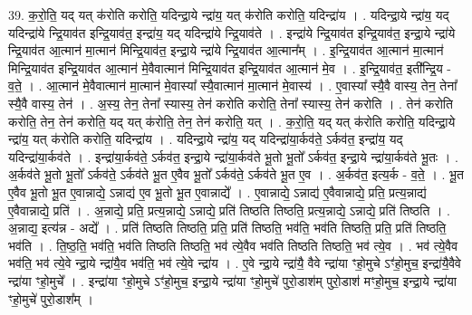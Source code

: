 \documentclass[17pt]{extarticle}
\begin{document}
39. क॒रो॒ति॒ यद् यत् क॑रोति करोति॒ यदिन्द्रा॒ये न्द्रा॑य॒ यत् क॑रोति करोति॒ यदिन्द्रा॑य । . यदिन्द्रा॒ये न्द्रा॑य॒ यद् यदिन्द्रा॑ये न्द्रि॒याव॑त इन्द्रि॒याव॑त॒ इन्द्रा॑य॒ यद् यदिन्द्रा॑ये न्द्रि॒याव॑ते । . इन्द्रा॑ये न्द्रि॒याव॑त इन्द्रि॒याव॑त॒ इन्द्रा॒ये न्द्रा॑ये न्द्रि॒याव॑त आ॒त्मान॑ मा॒त्मान॑ मिन्द्रि॒याव॑त॒ इन्द्रा॒ये न्द्रा॑ये न्द्रि॒याव॑त आ॒त्मान᳚म् । . इ॒न्द्रि॒याव॑त आ॒त्मान॑ मा॒त्मान॑ मिन्द्रि॒याव॑त इन्द्रि॒याव॑त आ॒त्मान॑ मे॒वैवात्मान॑ मिन्द्रि॒याव॑त इन्द्रि॒याव॑त आ॒त्मान॑ मे॒व । . इ॒न्द्रि॒याव॑त॒ इती᳚न्द्रि॒य - व॒ते॒ । . आ॒त्मान॑ मे॒वैवात्मान॑ मा॒त्मान॑ मे॒वास्या᳚ स्यै॒वात्मान॑ मा॒त्मान॑ मे॒वास्य॑ । . ए॒वास्या᳚ स्यै॒वै वास्य॒ तेन॒ तेना᳚ स्यै॒वै वास्य॒ तेन॑ । . अ॒स्य॒ तेन॒ तेना᳚ स्यास्य॒ तेन॑ करोति करोति॒ तेना᳚ स्यास्य॒ तेन॑ करोति । . तेन॑ करोति करोति॒ तेन॒ तेन॑ करोति॒ यद् यत् क॑रोति॒ तेन॒ तेन॑ करोति॒ यत् । . क॒रो॒ति॒ यद् यत् क॑रोति करोति॒ यदिन्द्रा॒ये न्द्रा॑य॒ यत् क॑रोति करोति॒ यदिन्द्रा॑य । . यदिन्द्रा॒ये न्द्रा॑य॒ यद् यदिन्द्रा॑या॒र्कव॑ते॒ ऽर्कव॑त॒ इन्द्रा॑य॒ यद् यदिन्द्रा॑या॒र्कव॑ते । . इन्द्रा॑या॒र्कव॑ते॒ ऽर्कव॑त॒ इन्द्रा॒ये न्द्रा॑या॒र्कव॑ते भू॒तो भू॒तो᳚ ऽर्कव॑त॒ इन्द्रा॒ये न्द्रा॑या॒र्कव॑ते भू॒तः । . अ॒र्कव॑ते भू॒तो भू॒तो᳚ ऽर्कव॑ते॒ ऽर्कव॑ते भू॒त ए॒वैव भू॒तो᳚ ऽर्कव॑ते॒ ऽर्कव॑ते भू॒त ए॒व । . अ॒र्कव॑त॒ इत्य॒र्क - व॒ते॒ । . भू॒त ए॒वैव भू॒तो भू॒त ए॒वान्नाद्ये॒ ऽन्नाद्य॑ ए॒व भू॒तो भू॒त ए॒वान्नाद्ये᳚ । . ए॒वान्नाद्ये॒ ऽन्नाद्य॑ ए॒वैवान्नाद्ये॒ प्रति॒ प्रत्य॒न्नाद्य॑ ए॒वैवान्नाद्ये॒ प्रति॑ । . अ॒न्नाद्ये॒ प्रति॒ प्रत्य॒न्नाद्ये॒ ऽन्नाद्ये॒ प्रति॑ तिष्ठति तिष्ठति॒ प्रत्य॒न्नाद्ये॒ ऽन्नाद्ये॒ प्रति॑ तिष्ठति । . अ॒न्नाद्य॒ इत्य॑न्न - अद्ये᳚ । . प्रति॑ तिष्ठति तिष्ठति॒ प्रति॒ प्रति॑ तिष्ठति॒ भव॑ति॒ भव॑ति तिष्ठति॒ प्रति॒ प्रति॑ तिष्ठति॒ भव॑ति । . ति॒ष्ठ॒ति॒ भव॑ति॒ भव॑ति तिष्ठति तिष्ठति॒ भव॑ त्ये॒वैव भव॑ति तिष्ठति तिष्ठति॒ भव॑ त्ये॒व । . भव॑ त्ये॒वैव भव॑ति॒ भव॑ त्ये॒वे न्द्रा॒ये न्द्रा॑यै॒व भव॑ति॒ भव॑ त्ये॒वे न्द्रा॑य । . ए॒वे न्द्रा॒ये न्द्रा॑यै॒ वैवे न्द्रा॑या ꣳहो॒मुचे ऽꣳ॑हो॒मुच॒ इन्द्रा॑यै॒वैवे न्द्रा॑या ꣳहो॒मुचे᳚ । . इन्द्रा॑या ꣳहो॒मुचे ऽꣳ॑हो॒मुच॒ इन्द्रा॒ये न्द्रा॑या ꣳहो॒मुचे॑ पुरो॒डाश॑म् पुरो॒डाश॑ मꣳहो॒मुच॒ इन्द्रा॒ये न्द्रा॑या ꣳहो॒मुचे॑ पुरो॒डाश᳚म् । \newline
\pagebreak
{}
\end{document}
